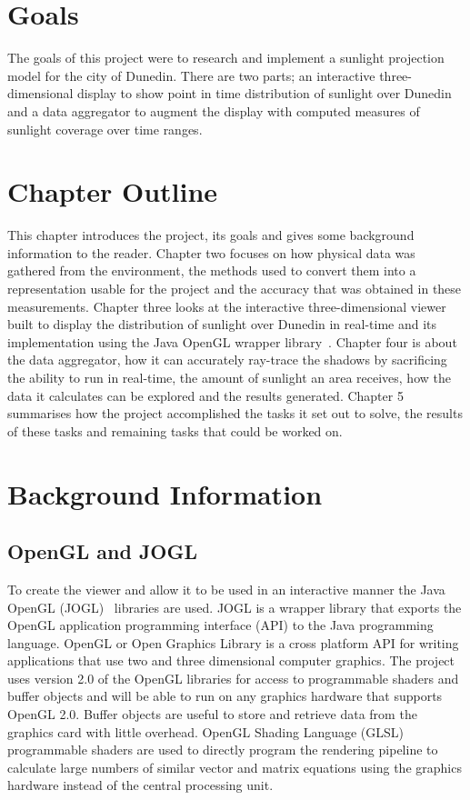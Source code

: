 \documentclass[12pt]{report}
\begin{document}
\section{Goals}
The goals of this project were to research and implement a sunlight projection model for the city of Dunedin. There are two parts; an interactive three-dimensional display to show point in time distribution of sunlight over Dunedin and a data aggregator to augment the display with computed measures of sunlight coverage over time ranges.

\section{Chapter Outline}
This chapter introduces the project, its goals and gives some background information to the reader. Chapter two focuses on how physical data was gathered from the environment, the methods used to convert them into a representation usable for the project and the accuracy that was obtained in these measurements. Chapter three looks at the interactive three-dimensional viewer built to display the distribution of sunlight over Dunedin in real-time and its implementation using the Java OpenGL wrapper library~\cite{JOGL}. Chapter four is about the data aggregator, how it can accurately ray-trace the shadows by sacrificing the ability to run in real-time, the amount of sunlight an area receives, how the data it calculates can be explored and the results generated. Chapter 5 summarises how the project accomplished the tasks it set out to solve, the results of these tasks and remaining tasks that could be worked on.

\section{Background Information}
\subsection{OpenGL and JOGL} 
To create the viewer and allow it to be used in an interactive manner the Java OpenGL (JOGL)~\cite{JOGL} libraries are used. JOGL is a wrapper library that exports the OpenGL application programming interface (API) to the Java programming language. OpenGL or Open Graphics Library is a cross platform API for writing applications that use two and three dimensional computer graphics. The project uses version 2.0 of the OpenGL libraries for access to programmable shaders and buffer objects and will be able to run on any graphics hardware that supports OpenGL 2.0. Buffer objects are useful to store and retrieve data from the graphics card with little overhead.
OpenGL Shading Language (GLSL) programmable shaders are used to directly program the rendering pipeline to calculate large numbers of similar vector and matrix equations using the graphics hardware instead of the central processing unit.
\end{document}
